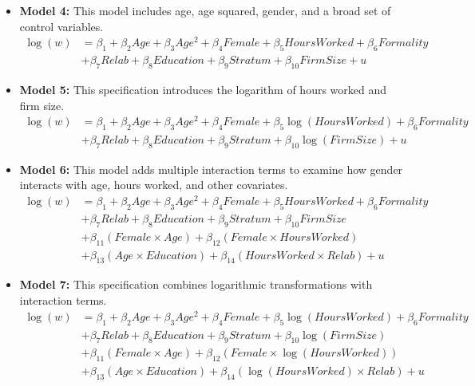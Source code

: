 \documentclass[11pt,a4paper,onecolumn]{article}
\begin{document}
        \begin{itemize}
            \item \textbf{Model 4:} This model includes age, age squared, gender, and a broad set of control variables.
            \begin{align*}
            \log(w) &= \beta_1 + \beta_2 Age + \beta_3 Age^2 + \beta_4 Female + \beta_5 HoursWorked + \beta_6 Formality \\
            &+ \beta_7 Relab + \beta_8 Education + \beta_9 Stratum + \beta_{10} FirmSize + u \tag{4}
            \end{align*}
            
            \item \textbf{Model 5:} This specification introduces the logarithm of hours worked and firm size.
            \begin{align*}
            \log(w) &= \beta_1 + \beta_2 Age + \beta_3 Age^2 + \beta_4 Female + \beta_5 \log(HoursWorked) + \beta_6 Formality \\ &+ \beta_7 Relab + \beta_8 Education + \beta_9 Stratum + \beta_{10} \log(FirmSize) + u \tag{5}
            \end{align*}
            
            \item \textbf{Model 6:} This model adds multiple interaction terms to examine how gender interacts with age, hours worked, and other covariates.
            \begin{align*}
            \log(w) &= \beta_1 + \beta_2 Age + \beta_3 Age^2 + \beta_4 Female + \beta_5 HoursWorked + \beta_6 Formality \\
            &+ \beta_7 Relab + \beta_8 Education + \beta_9 Stratum + \beta_{10} FirmSize \\ &+ \beta_{11} (Female \times Age) + \beta_{12} (Female \times HoursWorked) \\ &+ \beta_{13} (Age \times Education) + \beta_{14} (HoursWorked \times Relab) + u \tag{6}
            \end{align*}
            
            \item \textbf{Model 7:} This specification combines logarithmic transformations with interaction terms.
            \begin{align*}
            \log(w) &= \beta_1 + \beta_2 Age + \beta_3 Age^2 + \beta_4 Female + \beta_5 \log(HoursWorked) + \beta_6 Formality \\ &+ \beta_7 Relab + \beta_8 Education + \beta_9 Stratum + \beta_{10} \log(FirmSize) \\
            &+  \beta_{11} (Female \times Age) +  \beta_{12} (Female \times \log(HoursWorked)) \\ &+ \beta_{13} (Age \times Education) +  \beta_{14} (\log(HoursWorked) \times Relab) + u \tag{7}
            \end{align*}
            

\end{itemize}
\end{document}
